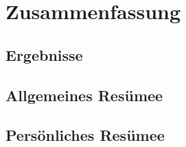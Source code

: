 \chapter{Zusammenfassung}

\section{Ergebnisse}

\section{Allgemeines Resümee}

\section{Persönliches Resümee}

